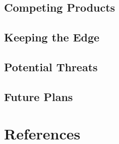 \documentclass[a4paper,12pt]{article}
\begin{document}
\subsection{Competing Products}

\subsection{Keeping the Edge}

\subsection{Potential Threats}

\subsection{Future Plans}

\section{References}




\end{document}
